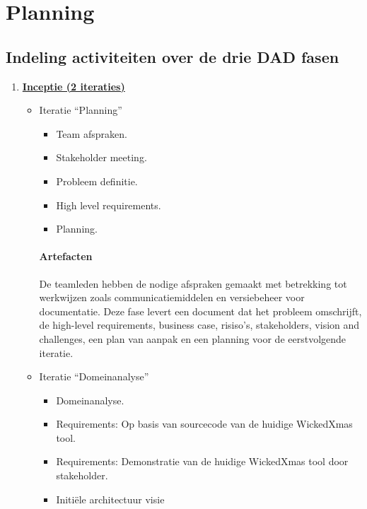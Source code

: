 
\section{Planning}
\subsection{Indeling activiteiten over de drie DAD fasen}
\label{sec:planning}
\begin{enumerate}
\item \underline{\textbf{Inceptie (2 iteraties)}}
		\begin{itemize}
		\item Iteratie ``Planning''
			\begin{itemize}
			\item Team afspraken.
			\item Stakeholder meeting.
			\item Probleem definitie.
			\item High level requirements.
			\item Planning.
			\end{itemize}
		\paragraph{Artefacten}
		De teamleden hebben de nodige afspraken gemaakt met betrekking tot
		werkwijzen zoals communicatiemiddelen en versiebeheer voor documentatie.
		Deze fase levert een document dat het probleem omschrijft,  de
		high-level requirements, business case, risiso's, stakeholders, vision
		and challenges, een plan van aanpak en een planning voor de eerstvolgende
		iteratie.
		\item Iteratie ``Domeinanalyse''
			\begin{itemize}
			\item Domeinanalyse.
			\item Requirements: Op basis van sourcecode van de huidige WickedXmas tool.
			\item Requirements: Demonstratie van de huidige WickedXmas tool door
			stakeholder.
			\item Initi\"ele architectuur visie
			\end{itemize}

\end{itemize}
\end{enumerate}
